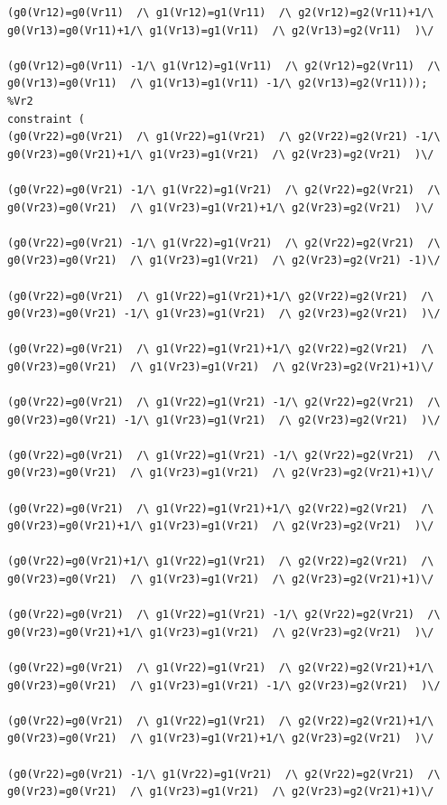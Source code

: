 \begin{appendices}
\begin{lstlisting}
(g0(Vr12)=g0(Vr11)  /\ g1(Vr12)=g1(Vr11)  /\ g2(Vr12)=g2(Vr11)+1/\ g0(Vr13)=g0(Vr11)+1/\ g1(Vr13)=g1(Vr11)  /\ g2(Vr13)=g2(Vr11)  )\/ 

(g0(Vr12)=g0(Vr11) -1/\ g1(Vr12)=g1(Vr11)  /\ g2(Vr12)=g2(Vr11)  /\ g0(Vr13)=g0(Vr11)  /\ g1(Vr13)=g1(Vr11) -1/\ g2(Vr13)=g2(Vr11)));
%Vr2
constraint (
(g0(Vr22)=g0(Vr21)  /\ g1(Vr22)=g1(Vr21)  /\ g2(Vr22)=g2(Vr21) -1/\ g0(Vr23)=g0(Vr21)+1/\ g1(Vr23)=g1(Vr21)  /\ g2(Vr23)=g2(Vr21)  )\/ 

(g0(Vr22)=g0(Vr21) -1/\ g1(Vr22)=g1(Vr21)  /\ g2(Vr22)=g2(Vr21)  /\ g0(Vr23)=g0(Vr21)  /\ g1(Vr23)=g1(Vr21)+1/\ g2(Vr23)=g2(Vr21)  )\/ 

(g0(Vr22)=g0(Vr21) -1/\ g1(Vr22)=g1(Vr21)  /\ g2(Vr22)=g2(Vr21)  /\ g0(Vr23)=g0(Vr21)  /\ g1(Vr23)=g1(Vr21)  /\ g2(Vr23)=g2(Vr21) -1)\/ 

(g0(Vr22)=g0(Vr21)  /\ g1(Vr22)=g1(Vr21)+1/\ g2(Vr22)=g2(Vr21)  /\ g0(Vr23)=g0(Vr21) -1/\ g1(Vr23)=g1(Vr21)  /\ g2(Vr23)=g2(Vr21)  )\/ 

(g0(Vr22)=g0(Vr21)  /\ g1(Vr22)=g1(Vr21)+1/\ g2(Vr22)=g2(Vr21)  /\ g0(Vr23)=g0(Vr21)  /\ g1(Vr23)=g1(Vr21)  /\ g2(Vr23)=g2(Vr21)+1)\/ 

(g0(Vr22)=g0(Vr21)  /\ g1(Vr22)=g1(Vr21) -1/\ g2(Vr22)=g2(Vr21)  /\ g0(Vr23)=g0(Vr21) -1/\ g1(Vr23)=g1(Vr21)  /\ g2(Vr23)=g2(Vr21)  )\/ 

(g0(Vr22)=g0(Vr21)  /\ g1(Vr22)=g1(Vr21) -1/\ g2(Vr22)=g2(Vr21)  /\ g0(Vr23)=g0(Vr21)  /\ g1(Vr23)=g1(Vr21)  /\ g2(Vr23)=g2(Vr21)+1)\/ 

(g0(Vr22)=g0(Vr21)  /\ g1(Vr22)=g1(Vr21)+1/\ g2(Vr22)=g2(Vr21)  /\ g0(Vr23)=g0(Vr21)+1/\ g1(Vr23)=g1(Vr21)  /\ g2(Vr23)=g2(Vr21)  )\/ 

(g0(Vr22)=g0(Vr21)+1/\ g1(Vr22)=g1(Vr21)  /\ g2(Vr22)=g2(Vr21)  /\ g0(Vr23)=g0(Vr21)  /\ g1(Vr23)=g1(Vr21)  /\ g2(Vr23)=g2(Vr21)+1)\/ 

(g0(Vr22)=g0(Vr21)  /\ g1(Vr22)=g1(Vr21) -1/\ g2(Vr22)=g2(Vr21)  /\ g0(Vr23)=g0(Vr21)+1/\ g1(Vr23)=g1(Vr21)  /\ g2(Vr23)=g2(Vr21)  )\/ 

(g0(Vr22)=g0(Vr21)  /\ g1(Vr22)=g1(Vr21)  /\ g2(Vr22)=g2(Vr21)+1/\ g0(Vr23)=g0(Vr21)  /\ g1(Vr23)=g1(Vr21) -1/\ g2(Vr23)=g2(Vr21)  )\/ 

(g0(Vr22)=g0(Vr21)  /\ g1(Vr22)=g1(Vr21)  /\ g2(Vr22)=g2(Vr21)+1/\ g0(Vr23)=g0(Vr21)  /\ g1(Vr23)=g1(Vr21)+1/\ g2(Vr23)=g2(Vr21)  )\/ 

(g0(Vr22)=g0(Vr21) -1/\ g1(Vr22)=g1(Vr21)  /\ g2(Vr22)=g2(Vr21)  /\ g0(Vr23)=g0(Vr21)  /\ g1(Vr23)=g1(Vr21)  /\ g2(Vr23)=g2(Vr21)+1)\/ 


\end{lstlisting}
\end{appendices}
